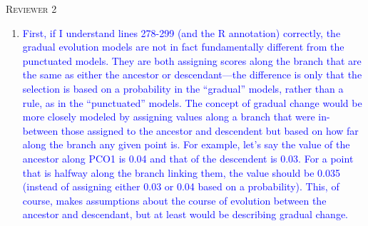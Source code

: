 \documentclass[12pt,letterpaper]{article}
\renewcommand{\section}[1]{%
\bigskip
\begin{center}
\begin{Large}
\normalfont\scshape #1
\medskip
\end{Large}
\end{center}}
\begin{document}
%
%





\section{Reviewer 2}

\begin{enumerate}



\item{\textcolor{blue}{First, if I understand lines 278-299 (and the R annotation) correctly, the gradual evolution models are not in fact fundamentally different from the punctuated models. They are both assigning scores along the branch that are the same as either the ancestor or descendant—the difference is only that the selection is based on a probability in the ``gradual'' models, rather than a rule, as in the ``punctuated'' models. The concept of gradual change would be more closely modeled by assigning values along a branch that were in-between those assigned to the ancestor and descendent but based on how far along the branch any given point is. For example, let’s say the value of the ancestor along PCO1 is 0.04 and that of the descendent is 0.03. For a point that is halfway along the branch linking them, the value should be 0.035 (instead of assigning either 0.03 or 0.04 based on a probability). This, of course, makes assumptions about the course of evolution between the ancestor and descendant, but at least would be describing gradual change.}}







\end{enumerate}
\end{document}
